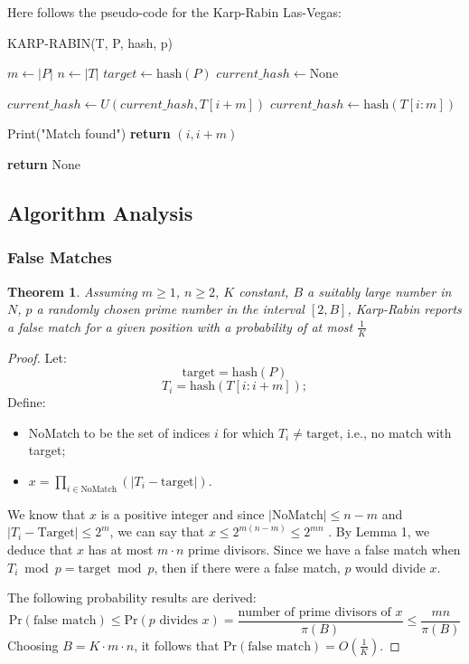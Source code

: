 \documentclass[a4paper, 12pt]{article}
\newtheorem{theorem}{Theorem}
\begin{document}
Here follows the pseudo-code for the Karp-Rabin Las-Vegas:

\begin{algorithm}[H]
\caption{KARP-RABIN(T, P, hash, p)}
\label{alg:karp-robin}
\begin{algorithmic}[1]
\STATE $m \leftarrow |P|$
\STATE $n \leftarrow |T|$
\STATE $target \leftarrow \mathrm{hash}(P)$
\STATE $current\_hash \leftarrow \text{None}$

\STATE $current\_hash \leftarrow U( current\_hash, T[i+m])$
\ELSE
\STATE $current\_hash \leftarrow \mathrm{hash}(T[i:m])$
\ENDIF

\STATE Print("Match found")
\STATE \textbf{return} $(i, i+m)$
\ENDIF
\ENDIF
\ENDFOR

\STATE \textbf{return} None
\end{algorithmic}
\end{algorithm}

\subsection{Algorithm Analysis}
\subsubsection{False Matches}
\begin{theorem}
Assuming \( m \geq 1 \), \( n \geq 2 \), \( K \) constant, \( B \) a suitably large number in \( N \), \( p \) a randomly chosen prime number in the interval \([2, B]\), Karp-Rabin reports a false match for a given position with a probability of at most $\frac{1}{K}$
\end{theorem}

\begin{proof}
Let:
\[ \text{target} = \text{hash}(P) \]
\[ T_i = \text{hash}(T[i:i+m]); \]
Define:
\begin{itemize}
\item NoMatch to be the set of indices \( i \) for which \( T_i \neq \text{target} \), i.e., no match with target;
\item \( x = \prod_{i \in \text{NoMatch}} (|T_i - \text{target}|) \).
\end{itemize}

We know that \( x\) is a positive integer and since \( | \text{NoMatch} | \leq n-m \) and \( | T_i - \text{Target} | \leq 2^m \), we can say that \( x \leq 2^{m (n-m)} \leq 2^{mn} \) . By Lemma 1, we deduce that \( x \) has at most \( m \cdot n \) prime divisors. Since we have a false match when \( T_{i} \bmod p  = \text{target} \bmod p \), then if there were a false match, \( p \) would divide \( x \).

The following probability results are derived:
\[ \text{Pr}(\text{false match}) \leq \text{Pr}(p \text{ divides } x) = \frac{\text{number of prime divisors of } x}{\pi (B)} \leq \frac{mn}{\pi (B)} \]
Choosing \( B = K \cdot m \cdot n \), it follows that \( \text{Pr}(\text{false match}) = O\left(\frac{1}{K}\right) \).
\end{proof}
\end{document}
